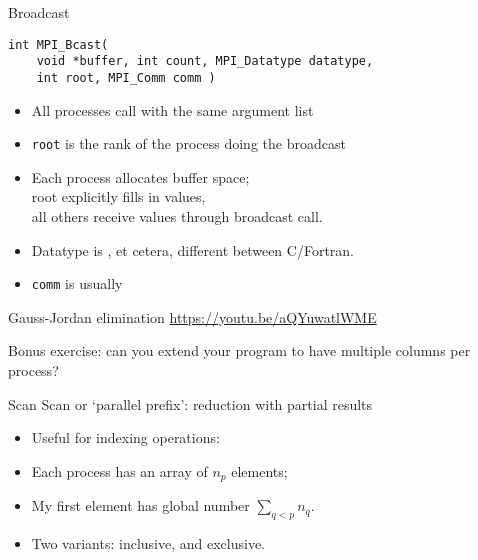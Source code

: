 \begin{numberedframe}{Broadcast}
\begin{lstlisting}
int MPI_Bcast(
    void *buffer, int count, MPI_Datatype datatype, 
    int root, MPI_Comm comm )
\end{lstlisting}
\begin{itemize}
\item All processes call with the same argument list
\item \lstinline{root} is the rank of the process doing the broadcast
\item Each process allocates buffer space;\\
  root explicitly fills in values,\\
  all others receive values through broadcast call.
\item Datatype is ,  et cetera, different
  between C/Fortran.
\item \lstinline{comm} is usually 
\end{itemize}
\end{numberedframe}

\begin{numberedframe}{Gauss-Jordan elimination}
  \url{https://youtu.be/aQYuwatlWME}
\end{numberedframe}

\begin{exerciseframe}[jordan]
  \small
  
\end{exerciseframe}

\begin{optexerciseframe}
  Bonus exercise: can you extend your program to have multiple columns
  per process?
\end{optexerciseframe}


\begin{numberedframe}{Scan}
Scan or `parallel prefix': reduction with partial results

\begin{itemize}
\item Useful for indexing operations:
\item Each process has an array of $n_p$ elements;
\item My first element has global number $\sum_{q<p}n_q$.
\item Two variants:  inclusive, and
   exclusive.
\end{itemize}
\end{numberedframe}

